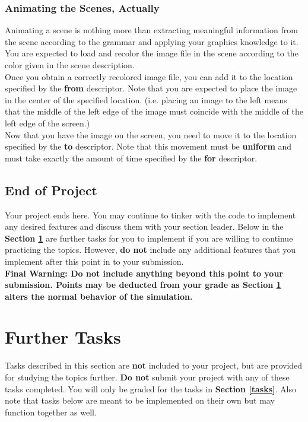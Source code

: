 \documentclass[a4paper]{article}
\begin{document}
	\subsubsection{Animating the Scenes, Actually}
	Animating a scene is nothing more than extracting meaningful information from the scene according to the grammar and applying your graphics knowledge to it. You are expected to load and recolor the image file in the scene according to the color given in the scene description.\\
	
	Once you obtain a correctly recolored image file, you can add it to the location specified by the \textbf{from} descriptor. Note that you are expected to place the image in the center of the specified location. (i.e. placing an image to the left means that the middle of the left edge of the image must coincide with the middle of the left edge of the screen.)\\
	
	Now that you have the image on the screen, you need to move it to the location specified by the \textbf{to} descriptor. Note that this movement must be \textbf{uniform} and must take exactly the amount of time specified by the \textbf{for} descriptor.
	
	
	\subsection{End of Project}
	Your project ends here. You may continue to tinker with the code to implement any desired features and discuss them with your section leader. Below in the \textbf{Section \ref{further}} are further tasks for you to implement if you are willing to continue practicing the topics. However, \textbf{do not} include any additional features that you implement after this point in to your submission.  
	\\
	
	\noindent \textbf{Final Warning: Do not include anything beyond this point to your submission. Points may be deducted from your grade as Section \ref{further} alters the normal behavior of the simulation.} 
	
	\section{Further Tasks}
	\label{further}
	Tasks described in this section are \textbf{not} included to your project, but are provided for studying the topics further. \textbf{Do not} submit your project with any of these tasks completed. You will only be graded for the tasks in \textbf{Section \ref{tasks}}. Also note that tasks below are meant to be implemented on their own but may function together as well.
	
\end{document}

